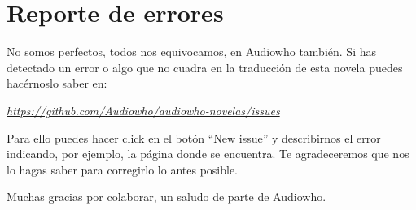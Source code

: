 \chapter*{Reporte de errores}

No somos perfectos, todos nos equivocamos, en Audiowho también. Si has detectado
un error o algo que no cuadra en la traducción de esta novela puedes hacérnoslo
saber en:

\mbox{}

\begin{center}
 \href{https://github.com/Audiowho/audiowho-novelas/issues}
 {\textit{https://github.com/Audiowho/audiowho-novelas/issues}}
\end{center}

\mbox{}

Para ello puedes hacer click en el botón “New issue” y describirnos el error
indicando, por ejemplo, la página donde se encuentra. Te agradeceremos que nos
lo hagas saber para corregirlo lo antes posible.

\mbox{}

Muchas gracias por colaborar, un saludo de parte de Audiowho.
